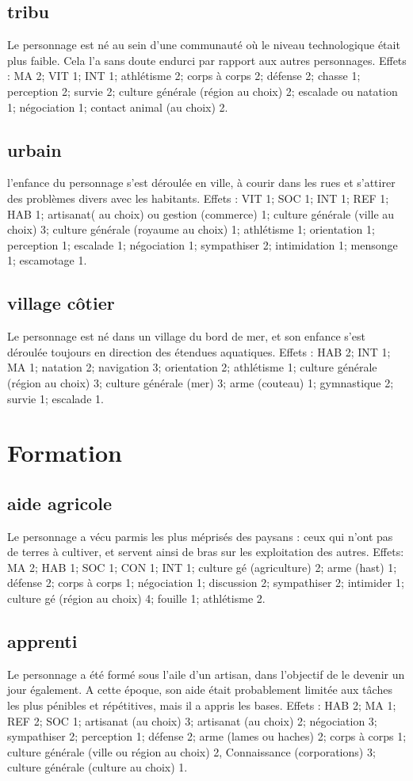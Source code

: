\documentclass[10pt,a4paper,twocolumn]{book}
\begin{document}
\subsection*{tribu}
Le personnage est né au sein d’une communauté où le niveau technologique était plus faible. Cela l’a sans doute endurci par rapport aux autres personnages.
Effets : MA 2; VIT 1; INT 1; athlétisme 2; corps à corps 2; défense 2; chasse 1; perception 2; survie 2; culture générale (région au choix) 2; escalade ou natation 1; négociation 1; contact animal (au choix) 2.
\subsection*{urbain}
l’enfance du personnage s’est déroulée en ville, à courir dans les rues et s’attirer des problèmes divers avec les habitants.
Effets : VIT 1; SOC 1; INT 1; REF 1; HAB 1; artisanat( au choix) ou gestion (commerce) 1; culture générale (ville au choix) 3; culture générale (royaume au choix) 1; athlétisme 1; orientation 1; perception 1; escalade 1; négociation 1; sympathiser 2; intimidation 1; mensonge 1; escamotage 1.
\subsection*{village côtier}
Le personnage est né dans un village du bord de mer, et son enfance s’est déroulée toujours en direction des étendues aquatiques.
Effets : HAB 2; INT 1; MA 1; natation 2; navigation 3; orientation 2; athlétisme 1; culture générale (région au choix) 3; culture générale (mer) 3; arme (couteau) 1; gymnastique 2; survie 1; escalade 1.

\section{Formation}
\subsection*{aide agricole}
Le personnage a vécu parmis les plus méprisés des paysans : ceux qui n’ont pas de terres à cultiver, et servent ainsi de bras sur les exploitation des autres.
Effets: MA 2; HAB 1; SOC 1; CON 1; INT 1; culture gé (agriculture) 2; arme (hast) 1; défense 2; corps à corps 1; négociation 1; discussion 2; sympathiser 2; intimider 1; culture gé (région au choix) 4; fouille 1; athlétisme 2.
\subsection*{apprenti}
Le personnage a été formé sous l’aile d’un artisan, dans l’objectif de le devenir un jour également. A cette époque, son aide était probablement limitée aux tâches les plus pénibles et répétitives, mais il a appris les bases.
Effets : HAB 2; MA 1; REF 2; SOC 1; artisanat (au choix) 3; artisanat (au choix) 2; négociation 3; sympathiser 2; perception 1; défense 2; arme (lames ou haches) 2; corps à corps 1; culture générale (ville ou région au choix) 2, Connaissance (corporations) 3; culture générale (culture au choix) 1.
\end{document}

